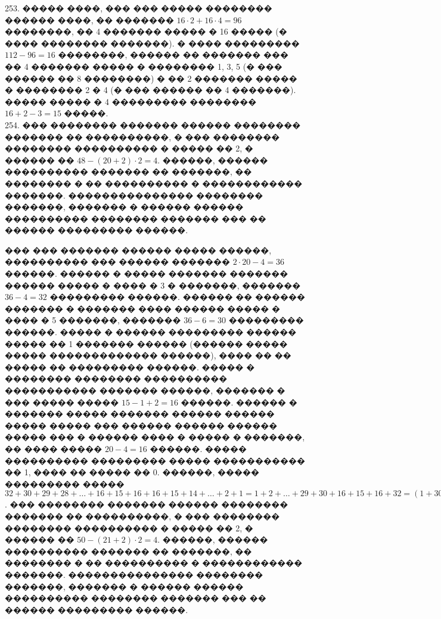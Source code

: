 \documentclass[12pt]{article}
\begin{document}
253. ����� ����, ��� ��� ����� �������� ������ ����, �� ������� $16\cdot2+16\cdot4=96$ ��������, �� 4 ������� ����� � 16 ����� (� ���� �������� �������). � ���� ��������� $112-96=16$ ��������, ������ �� ������� ��� �� 4 ������� ����� � �������� 1, 3, 5 (� ��� ������ �� 8 ��������) � �� 2 ������� ����� � �������� 2 � 4 (� ��� ������ �� 4 �������). ����� ����� � 4 ��������� �������� $16+2-3=15$ �����.\\
254. ��� �������� ������� ������ �������� ������� �� ����������, � ��� �������� �������� ���������� � ����� �� 2, � ������ �� $48-(20+2)\cdot2=4.$ ������, ������ ���������� ������� �� �������, �� �������� � �� ���������� � ������������ �������. ��������������� �������� �������, ������� � ������ ������ ���������� �������� ������� ��� �� ������ ��������� ������.
\begin{center}
\begin{figure}[ht!]
\end{figure}
\end{center}
��� ��� ������� ������ ����� ������, ���������� ��� ������ ������� $2\cdot20-4=36$ ������. ������ � ����� ������� ������� ������ ����� � ���� � 3 � �������, ������� $36-4=32$ ��������� ������. ������ �� ������ ������� � ������� ���� ������ ����� � ���� � 5 �������, ������� $36-6=30$ ��������� ������. ����� � ������ ��������� ������ ����� �� 1 ������� ������ (������ ����� ����� ������������� ������), ���� �� �� ����� �� ��������� ������. ����� � �������� �������� ���������� ����������� ������� ������, ������� � ��� ����� ����� $15-1+2=16$ ������. ������ � ������� ����� ������� ������ ������ ����� ����� ��� ������ ������ ������ ����� ��� � ������ ���� � ����� � �������, �� ���� ����� $20-4=16$ ������. ����� ���������� ��������� ����� ����������� �� 1, ���� �� ����� �� 0. ������, ����� ��������� ����� $32+30+29+28+\ldots+16+15+16+16+15+14+\ldots+2+1=1+2+\ldots+29+30+16+15+16+32=(1+30)+(2+29)+\ldots+(15+16)+79=31\cdot15+79=544.$\newpage{}. ��� �������� ������� ������ �������� ������� �� ����������, � ��� �������� �������� ���������� � ����� �� 2, � ������ �� $50-(21+2)\cdot2=4.$ ������, ������ ���������� ������� �� �������, �� �������� � �� ���������� � ������������ �������. ��������������� �������� �������, ������� � ������ ������ ���������� �������� ������� ��� �� ������ ��������� ������.
\begin{center}
\begin{figure}[ht!]
\end{figure}
\end{center}
\end{document}
